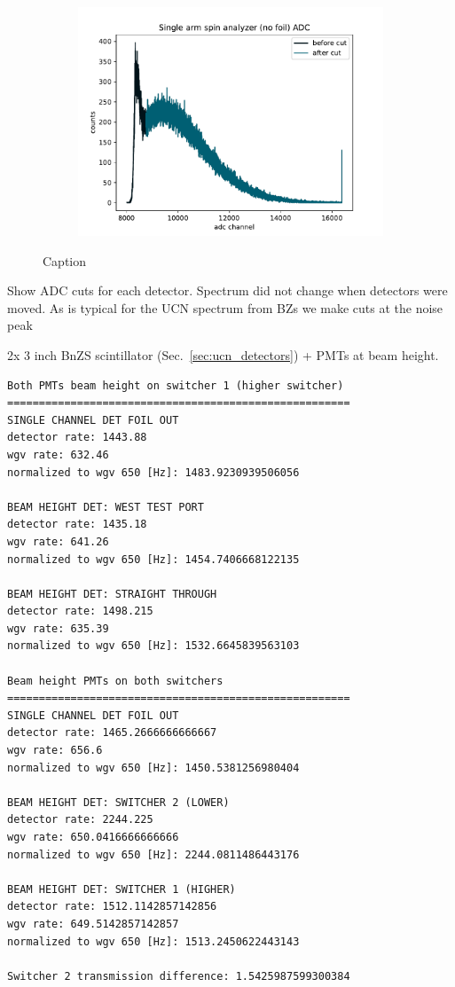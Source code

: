 \begin{figure}
\begin{subfigure}{.5\textwidth}
  \caption{}\label{subfig:beam_det_2_adc}
\end{subfigure}
\begin{subfigure}{.5\textwidth}
  \centering
  \includegraphics[width=\textwidth]{figures/2021_single_arm_no_foil_adc.pdf}
  \caption{}\label{subfig:single_arm_no_foil_adc}
\end{subfigure}
\caption
{Caption}
\label{fig:2021_detector_adc}
\end{figure}

Show ADC cuts for each detector. Spectrum did not change when detectors were moved. As is typical for the UCN spectrum from BZs we make cuts at the noise peak~\cite{jeph_multilayer_2015}

2x 3 inch BnZS scintillator (Sec.~\ref{sec:ucn_detectors})  + PMTs at beam height. 

\begin{small}
\begin{verbatim}
Both PMTs beam height on switcher 1 (higher switcher)
======================================================
SINGLE CHANNEL DET FOIL OUT
detector rate: 1443.88
wgv rate: 632.46
normalized to wgv 650 [Hz]: 1483.9230939506056

BEAM HEIGHT DET: WEST TEST PORT
detector rate: 1435.18
wgv rate: 641.26
normalized to wgv 650 [Hz]: 1454.7406668122135

BEAM HEIGHT DET: STRAIGHT THROUGH
detector rate: 1498.215
wgv rate: 635.39
normalized to wgv 650 [Hz]: 1532.6645839563103

Beam height PMTs on both switchers
======================================================
SINGLE CHANNEL DET FOIL OUT
detector rate: 1465.2666666666667
wgv rate: 656.6
normalized to wgv 650 [Hz]: 1450.5381256980404

BEAM HEIGHT DET: SWITCHER 2 (LOWER)
detector rate: 2244.225
wgv rate: 650.0416666666666
normalized to wgv 650 [Hz]: 2244.0811486443176

BEAM HEIGHT DET: SWITCHER 1 (HIGHER)
detector rate: 1512.1142857142856
wgv rate: 649.5142857142857
normalized to wgv 650 [Hz]: 1513.2450622443143

Switcher 2 transmission difference: 1.5425987599300384
\end{verbatim}
\end{small}

